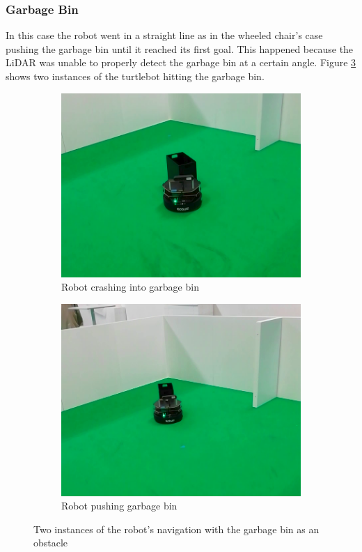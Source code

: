 \subsubsection{Garbage Bin}


In this case the robot went in a straight line as in the wheeled chair's case pushing the garbage bin until it reached its first goal. This happened because the \ac{LiDAR} was unable to properly detect the garbage bin at a certain angle.  Figure \ref{fig:garbageLF} shows two instances of the turtlebot hitting the garbage bin.
\begin{figure}[ht!]
  \centering
  \begin{subfigure}[b]{0.49\linewidth}
    \includegraphics[width=\linewidth]{imgs/chapter5/garbageLF.png}
     \caption{Robot crashing into garbage bin}
     \label{fig:garbageLF1}
  \end{subfigure}
  \begin{subfigure}[b]{0.47\linewidth}
    \includegraphics[width=\linewidth]{imgs/chapter5/garbageLF2.png}
    \caption{Robot pushing garbage bin}
    \label{fig:garbageLF2}
  \end{subfigure}
  \caption{Two instances of the robot's navigation with the garbage bin as an obstacle}
  \label{fig:garbageLF}
\end{figure}


